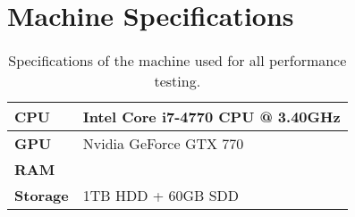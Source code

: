 \chapter{Machine Specifications} \label{AppendixD}

\begin{table}[]
  \centering
	    \begin{tabular}{|p{8cm}|p{8cm}|}
	    \hline
	    \textbf{CPU} & Intel Core i7-4770 CPU @ 3.40GHz\\
	    \hline
	    \textbf{GPU} & Nvidia GeForce GTX 770\\
	    \hline
	    \textbf{RAM} & \\
	    \hline
	    \textbf{Storage} & 1TB HDD + 60GB SDD\\
		\end{tabular}
		\caption{Specifications of the machine used for all performance testing.}
	  \label{tab:maximum_reproduction_areas}
\end{table}
